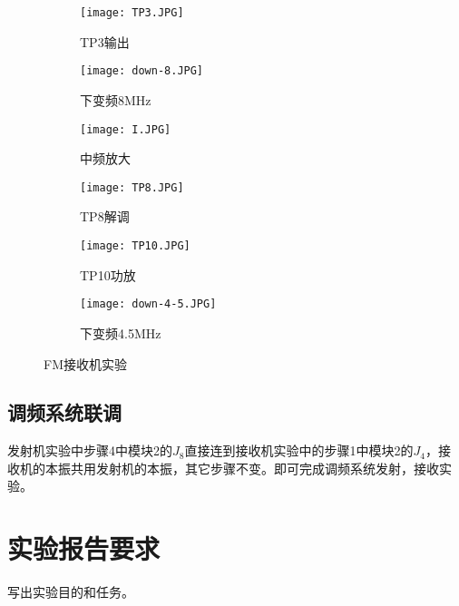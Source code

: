 \documentclass[../main]{subfiles}
\begin{document}
\begin{figure}[htbp]
	\centering
	\begin{subfigure}[htbp]{.45\linewidth}
		\centering
		\texttt{[image: TP3.JPG]}
		\caption{TP3输出}
		\label{fig:TP3输出}
	\end{subfigure}
	\quad
	\begin{subfigure}[htbp]{.45\linewidth}
		\centering
		\texttt{[image: down-8.JPG]}
		\caption{下变频8MHz}
		\label{fig:下变频8MHz}
	\end{subfigure}

	\begin{subfigure}[htbp]{.45\linewidth}
		\centering
		\texttt{[image: I.JPG]}
		\caption{中频放大}
		\label{fig:中频放大}
	\end{subfigure}
	\quad
	\begin{subfigure}[htbp]{.45\linewidth}
		\centering
		\texttt{[image: TP8.JPG]}
		\caption{TP8解调}
		\label{fig:TP8解调}
	\end{subfigure}

	\begin{subfigure}[htbp]{.45\linewidth}
		\centering
		\texttt{[image: TP10.JPG]}
		\caption{TP10功放}
		\label{fig:TP10功放}
	\end{subfigure}
	\quad
	\begin{subfigure}[htbp]{.45\linewidth}
		\centering
		\texttt{[image: down-4-5.JPG]}
		\caption{下变频4.5MHz}
		\label{fig:下变频4.5MHz}
	\end{subfigure}
	\caption{FM接收机实验}
	\label{fig:FM接收机实验}
\end{figure}

\subsection{调频系统联调}%
\label{sub:调频系统联调}

发射机实验中步骤4中模块2的$ J_8 $直接连到接收机实验中的步骤1中模块2的$ J_4 $，接
收机的本振共用发射机的本振，其它步骤不变。即可完成调频系统发射，接收实验。

\section{实验报告要求}%
\label{sec:\arabic{chapter}实验报告要求}

\begin{Exercise}

	写出实验目的和任务。

\end{Exercise}
\end{document}
